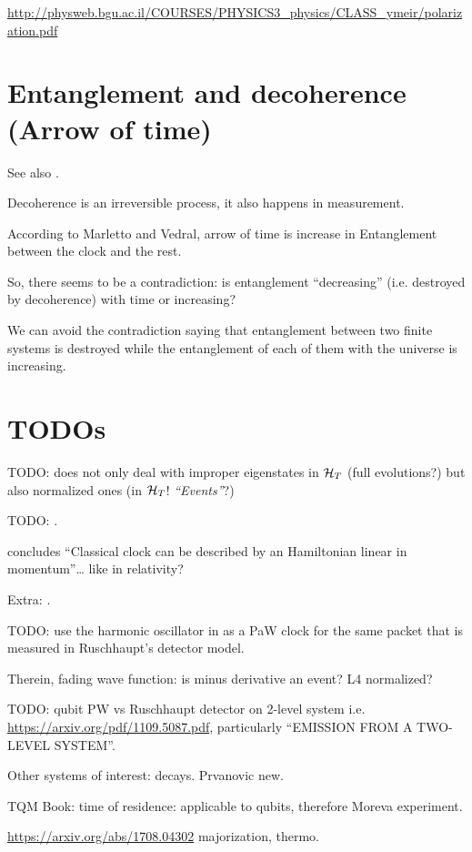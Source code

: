 \url{http://physweb.bgu.ac.il/COURSES/PHYSICS3_physics/CLASS_ymeir/polarization.pdf}

\section{Entanglement and decoherence (Arrow of time)}
See also \cite{EntanglementVsDecoherence}.

Decoherence is an irreversible process, it also happens in measurement.

According to Marletto and Vedral, arrow of time is increase in Entanglement
between the clock and the rest.

So, there seems to be a contradiction: is entanglement ``decreasing''
(i.e. destroyed by decoherence) with time
or increasing?

We can avoid the contradiction saying that
entanglement between two finite systems is
destroyed while the entanglement of each of them with the universe
is increasing.

\fi

\iftodo
\section{TODOs}

TODO: \cite{Lloyd:Time} does not only deal with improper eigenstates in $\mathcal{H}_T$
(full evolutions?)
but also normalized ones (in $\mathcal{H}_T$! \emph{``Events''}?)

TODO: \cite{RealisticClocks}.

\cite{HarmonicClocks} concludes ``Classical clock can be described by an Hamiltonian linear in momentum''\dots
like in relativity?

Extra: \cite{TimeAnyons}.

TODO: use the harmonic oscillator in \cite{HarmonicClocks}
as a PaW clock for the same packet that is measured in
Ruschhaupt's detector model.

Therein, fading wave function: is minus derivative an event?
L4 normalized?

TODO: qubit PW vs Ruschhaupt detector on 2-level system  i.e. \url{https://arxiv.org/pdf/1109.5087.pdf},
particularly ``EMISSION FROM A TWO-LEVEL SYSTEM''.

Other systems of interest: decays. Prvanovic new.

TQM Book: time of residence: applicable to qubits, therefore Moreva experiment.

\url{https://arxiv.org/abs/1708.04302} majorization, thermo.

\fi

